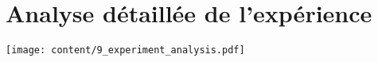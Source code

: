 \chapter{Analyse détaillée de l'expérience}
\label{appendix:experiment_analysis}

\texttt{[image: content/9\_experiment\_analysis.pdf]}
